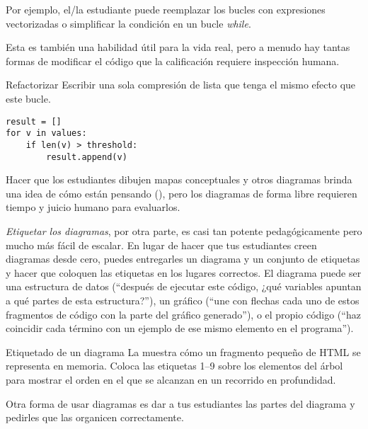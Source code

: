 Por ejemplo, 
el/la estudiante puede reemplazar los bucles con expresiones vectorizadas
 o simplificar la condición en un bucle \emph{while}.

Esta es también una habilidad útil para la vida real, 
pero a menudo hay tantas formas de modificar el código
que la calificación requiere inspección humana.

\begin{aside}{Refactorizar}
  Escribir una sola compresión de lista que tenga el mismo efecto que este bucle.

\begin{verbatim}
result = []
for v in values:
    if len(v) > threshold:
        result.append(v)
\end{verbatim}
\end{aside}



Hacer que los estudiantes dibujen mapas conceptuales y otros diagramas brinda una idea de cómo están pensando (),
pero los diagramas de forma libre requieren tiempo y juicio humano para evaluarlos.

\emph{Etiquetar los diagramas},
por otra parte, 
es casi tan potente pedagógicamente  
pero mucho más fácil de escalar.
En lugar de hacer que tus estudiantes creen diagramas desde cero, puedes entregarles un diagrama y un conjunto de etiquetas y hacer que coloquen las etiquetas en los lugares correctos.
El diagrama puede ser una estructura de datos (``después de ejecutar este código, ¿qué variables apuntan a qué partes de esta estructura?''), un gráfico (``une con flechas cada uno de estos fragmentos de código con la parte del gráfico generado''), o el propio código (``haz coincidir cada término con un ejemplo de ese mismo elemento en el programa'').

\begin{aside}{Etiquetado de un diagrama}
  La  muestra
cómo un fragmento pequeño de HTML se representa en memoria.
  Coloca las etiquetas 1--9 sobre los elementos del árbol 
  para mostrar el orden en el que se alcanzan en un recorrido en profundidad.
\end{aside}




Otra forma de usar diagramas es dar a tus estudiantes las partes del diagrama y pedirles que las organicen correctamente.


